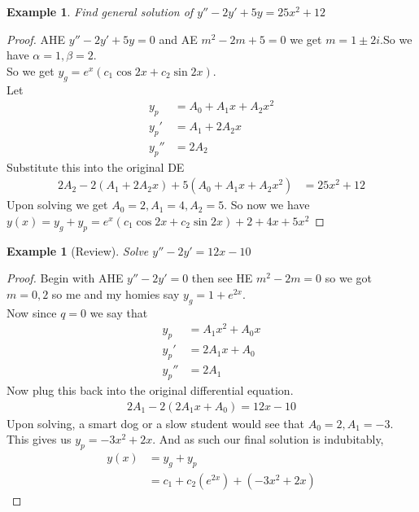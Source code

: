 \documentclass[oneside,11pt,pdftex,final]{book}%
\numberwithin{equation}{section}
\newtheorem{example}[theorem]{Example}
\numberwithin{section}{chapter}
\numberwithin{equation}{chapter}
\begin{document}
\begin{example}
	Find general solution of $ y''-2y'+5y=25x^2+12 $
\end{example}
\begin{proof}
	AHE $ y''-2y'+5y=0 $ and AE $ m^2-2m+5=0 $ we get $ m=1\pm2i $.So we have $ \alpha=1, \beta=2 $.\\
	So we get $ y_g=e^{x}(c_1 \cos 2x + c_2 \sin 2x) $.\\
	Let
	\begin{align*}
		y_p&=A_0+A_1x+A_2x^2\\
		y_p'&=A_1+2A_2x\\
		y_p''&=2A_2
	\end{align*}
Substitute this into the original DE
\begin{align*}
	2A_2-2(A_1+2A_2x)+5(A_0+A_1x+A_2x^2)&=25x^2+12
\end{align*}
Upon solving we get $ A_0=2, A_1=4, A_2=5 $. So now we have $ y(x)=y_g+y_p=e^{x}(c_1 \cos 2x + c_2 \sin 2x)+2+4x+5x^2 $
\end{proof}

\begin{example}[Review]
	Solve $y''-2y'=12x-10$
\end{example}
\begin{proof}
	Begin with AHE $ y''-2y'=0 $ then see HE $ m^2-2m=0 $ so we got $ m= 0, 2$ so me and my homies say $ y_g=1+e^{2x} $.\\
	Now since $ q=0 $ we say that
	\begin{align*}
		  y_p&=A_1x^2+A_0x\\
		  y_p'&=2A_1x+A_0\\
		  y_p''&=2A_1
	\end{align*}
Now plug this back into the original differential equation.
\begin{align*}
	2A_1-2(2A_1x+A_0)=12x-10
\end{align*}
Upon solving, a smart dog or a slow student would see that $ A_0=2, A_1=-3 $. This gives us $ y_p=-3x^2+2x $. And as such our final solution is indubitably,
\begin{align*}
	y(x)&=y_g+y_p\\
	&=c_1+c_2(e^{2x})+(-3x^2+2x)
\end{align*} 
\end{proof}
\end{document}
